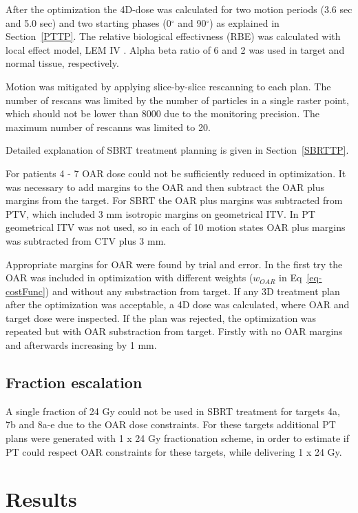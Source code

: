 \documentclass[type=dr, dr=rernat, accentcolor=tud7b,colorbacktitle, bigchapter, openright, twoside, 12pt ]{tudthesis}
\begin{document}
After the optimization the 4D-dose was calculated for two motion periods (3.6 sec and 5.0 sec) and two starting phases (0$^\circ$ and 90$^\circ$) as explained in Section~\ref{PTTP}. 
The relative biological effectivness (RBE) was calculated with local effect model, LEM IV \cite{Elsaesser2010}. 
Alpha beta ratio of 6 and 2 was used in target and normal tissue, respectively.

Motion was mitigated by applying slice-by-slice rescanning to each plan. 
The number of rescans was limited by the number of particles in a single raster point, which should not be lower than 8000 due to the
monitoring precision. The maximum number of rescanns was limited to 20.

Detailed explanation of SBRT treatment planning is given in Section~\ref{SBRTTP}.

For patients 4 - 7 OAR dose could not be sufficiently reduced in optimization. It was necessary to add margins to the OAR and then 
subtract the OAR plus margins from the target. For SBRT the OAR plus margins was subtracted from PTV, which included 3 mm isotropic margins on geometrical ITV. 
In PT geometrical ITV was not used, so in each of 10 motion states OAR plus margins was subtracted from CTV plus 3 mm. 

Appropriate margins for OAR were found by trial and error. In the first try the OAR was included in optimization with different weights ($w_{OAR}$ in Eq~\ref{eq-costFunc}) and without any substraction from target. 
If any 3D treatment plan after the optimization was acceptable, a 4D dose was calculated, 
where OAR and target dose were inspected. If the plan was rejected, the optimization was repeated but with OAR substraction from target. 
Firstly with no OAR margins and afterwards increasing by 1 mm. 


\subsection{Fraction escalation}

A single fraction of 24 Gy could not be used in SBRT treatment for targets 4a, 7b and 8a-e due to the OAR dose constraints. For these targets additional PT plans were generated with 1 x 24 Gy fractionation scheme, in order
to estimate if PT could respect OAR constraints for these targets, while delivering 1 x 24 Gy. 


\section{Results}
\end{document}
